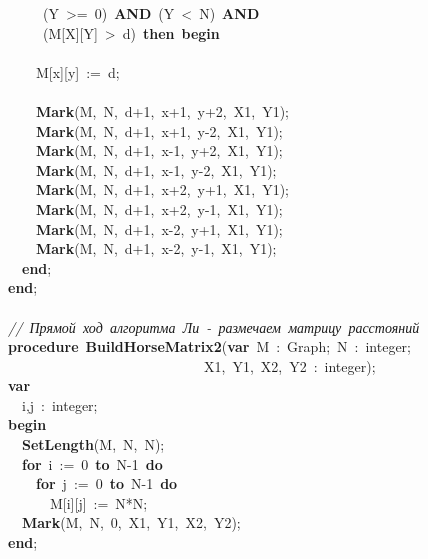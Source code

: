 \mbox{}\ \ \ \ \ (Y\ \textgreater{}=\ 0)\ \textbf{AND}\ (Y\ \textless{}\ N)\ \textbf{AND} \\
\mbox{}\ \ \ \ \ (M[X][Y]\ \textgreater{}\ d)\ \textbf{then}\ \textbf{begin} \\
\mbox{} \\
\mbox{}\ \ \ \ M[x][y]\ :=\ d; \\
\mbox{} \\
\mbox{}\ \ \ \ \textbf{Mark}(M,\ N,\ d+1,\ x+1,\ y+2,\ X1,\ Y1); \\
\mbox{}\ \ \ \ \textbf{Mark}(M,\ N,\ d+1,\ x+1,\ y-2,\ X1,\ Y1); \\
\mbox{}\ \ \ \ \textbf{Mark}(M,\ N,\ d+1,\ x-1,\ y+2,\ X1,\ Y1); \\
\mbox{}\ \ \ \ \textbf{Mark}(M,\ N,\ d+1,\ x-1,\ y-2,\ X1,\ Y1); \\
\mbox{}\ \ \ \ \textbf{Mark}(M,\ N,\ d+1,\ x+2,\ y+1,\ X1,\ Y1); \\
\mbox{}\ \ \ \ \textbf{Mark}(M,\ N,\ d+1,\ x+2,\ y-1,\ X1,\ Y1); \\
\mbox{}\ \ \ \ \textbf{Mark}(M,\ N,\ d+1,\ x-2,\ y+1,\ X1,\ Y1); \\
\mbox{}\ \ \ \ \textbf{Mark}(M,\ N,\ d+1,\ x-2,\ y-1,\ X1,\ Y1); \\
\mbox{}\ \ \textbf{end}; \\
\mbox{}\textbf{end}; \\
\mbox{} \\
\mbox{}\textit{//\ Прямой\ ход\ алгоритма\ Ли\ -\ размечаем\ матрицу\ расстояний} \\
\mbox{}\textbf{procedure}\ \textbf{BuildHorseMatrix2}(\textbf{var}\ M\ :\ Graph;\ N\ :\ integer; \\
\mbox{}\ \ \ \ \ \ \ \ \ \ \ \ \ \ \ \ \ \ \ \ \ \ \ \ \ \ \ \ X1,\ Y1,\ X2,\ Y2\ :\ integer); \\
\mbox{}\textbf{var} \\
\mbox{}\ \ i,j\ :\ integer; \\
\mbox{}\textbf{begin} \\
\mbox{}\ \ \textbf{SetLength}(M,\ N,\ N); \\
\mbox{}\ \ \textbf{for}\ i\ :=\ 0\ \textbf{to}\ N-1\ \textbf{do} \\
\mbox{}\ \ \ \ \textbf{for}\ j\ :=\ 0\ \textbf{to}\ N-1\ \textbf{do} \\
\mbox{}\ \ \ \ \ \ M[i][j]\ :=\ N*N; \\
\mbox{}\ \ \textbf{Mark}(M,\ N,\ 0,\ X1,\ Y1,\ X2,\ Y2); \\
\mbox{}\textbf{end}; \\

